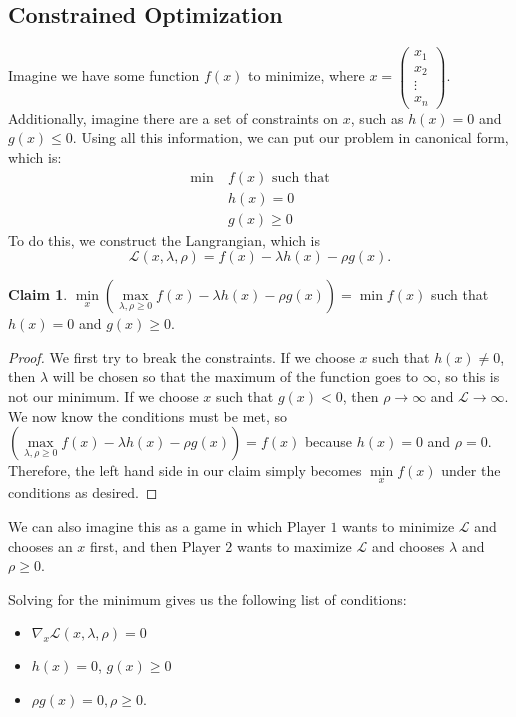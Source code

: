 \documentclass[12pt]{article}
\theoremstyle{plain} %
\theoremstyle{definition}
\newtheorem*{claim}{Claim}
\theoremstyle{definition}
\theoremstyle{definition}
\theoremstyle{remark}
\newcommand{\Lagr}{\mathcal{L}}
\begin{document}
\subsection{Constrained Optimization}
Imagine we have some function $f(x)$ to minimize,
where $x = \begin{pmatrix} x_1 \\ x_2 \\ \vdots \\ x_n \end{pmatrix}$. Additionally, imagine there are a set of constraints on $x$, such as $h(x) = 0$ and $g(x) \leq 0$. Using all this information, we can put our problem in canonical form, which is:
\begin{align*}
    \min \  &f(x) \text{ such that} \\
    &h(x) = 0 \\
    &g(x) \geq 0
\end{align*}
To do this, we construct the Langrangian, which is
\[ \Lagr \left(x,\lambda,\rho \right) = f(x) - \lambda h(x) -\rho g(x). \]
\begin{claim}
    $\min\limits_x\left(\max\limits_{\lambda,\rho\geq0}  f(x) - \lambda h(x) -\rho g(x)\right) = \min f(x)$ such that $h(x) = 0 $ and $g(x) \geq 0$.
\end{claim}
\begin{proof}
We first try to break the constraints. If we choose $x$ such that $h(x) \neq 0$, then $\lambda$ will be chosen so that the maximum of the function goes to $\infty$, so this is not our minimum. If we choose $x$ such that $g(x) < 0$, then $\rho \to \infty$ and $\Lagr \to \infty$. We now know the conditions must be met, so $\left(\max\limits_{\lambda,\rho\geq0}  f(x) - \lambda h(x) -\rho g(x)\right) = f(x)$ because $h(x) = 0$ and $\rho = 0$. Therefore, the left hand side in our claim simply becomes $\min\limits_x f(x)$ under the conditions as desired.
\end{proof}
We can also imagine this as a game in which Player $1$ wants to minimize $\Lagr$ and chooses an $x$ first, and then Player $2$ wants to maximize $\Lagr$ and chooses $\lambda$ and $\rho \geq 0$.

Solving for the minimum gives us the following list of conditions:
\begin{itemize}
    \item $\nabla_x \Lagr(x,\lambda,\rho) = 0$
    \item $h(x) = 0$, $g(x) \geq 0$ %
    \item $\rho g(x) = 0, \rho \geq 0$.
\end{itemize}
\end{document}
